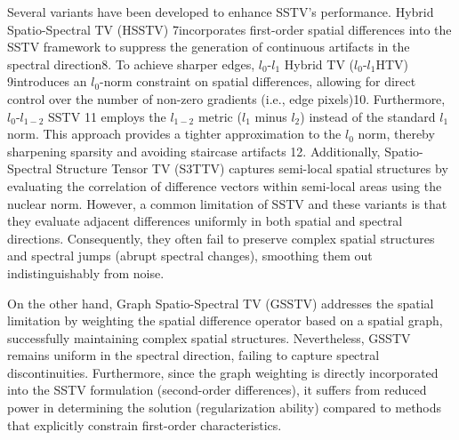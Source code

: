 Several variants have been developed to enhance SSTV's performance. Hybrid Spatio-Spectral TV (HSSTV) 7incorporates first-order spatial differences into the SSTV framework to suppress the generation of continuous artifacts in the spectral direction8. To achieve sharper edges, $l_0$-$l_1$ Hybrid TV ($l_0$-$l_1$HTV) 9introduces an $l_0$-norm constraint on spatial differences, allowing for direct control over the number of non-zero gradients (i.e., edge pixels)10. Furthermore, $l_0$-$l_{1-2}$ SSTV 11 employs the $l_{1-2}$ metric ($l_1$ minus $l_2$) instead of the standard $l_1$ norm. This approach provides a tighter approximation to the $l_0$ norm, thereby sharpening sparsity and avoiding staircase artifacts 12. Additionally, Spatio-Spectral Structure Tensor TV (S3TTV) captures semi-local spatial structures by evaluating the correlation of difference vectors within semi-local areas using the nuclear norm. However, a common limitation of SSTV and these variants is that they evaluate adjacent differences uniformly in both spatial and spectral directions. Consequently, they often fail to preserve complex spatial structures and spectral jumps (abrupt spectral changes), smoothing them out indistinguishably from noise.


On the other hand, Graph Spatio-Spectral TV (GSSTV) addresses the spatial limitation by weighting the spatial difference operator based on a spatial graph, successfully maintaining complex spatial structures. Nevertheless, GSSTV remains uniform in the spectral direction, failing to capture spectral discontinuities. Furthermore, since the graph weighting is directly incorporated into the SSTV formulation (second-order differences), it suffers from reduced power in determining the solution (regularization ability) compared to methods that explicitly constrain first-order characteristics. %



